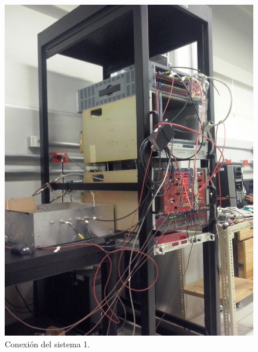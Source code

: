 \documentclass[a4paper,10pt]{article}
\numberwithin{equation}{section}
\begin{document}
\begin{figure}[H]
 \center 
 \includegraphics[scale=0.1]{Imagenes/sistema1}
 \caption{Conexión del sistema 1.}
\end{figure}
\end{document}

